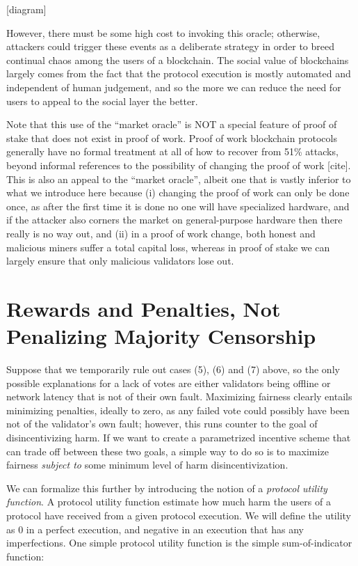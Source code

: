 \documentclass[12pt, final]{article}
\begin{document}
[diagram]

However, there must be some high cost to invoking this oracle; otherwise, attackers could trigger these events as a deliberate strategy in order to breed continual chaos among the users of a blockchain. The social value of blockchains largely comes from the fact that the protocol execution is mostly automated and independent of human judgement, and so the more we can reduce the need for users to appeal to the social layer the better.

Note that this use of the ``market oracle'' is NOT a special feature of proof of stake that does not exist in proof of work. Proof of work blockchain protocols generally have no formal treatment at all of how to recover from 51\% attacks, beyond informal references to the possibility of changing the proof of work [cite]. This is also an appeal to the ``market oracle'', albeit one that is vastly inferior to what we introduce here because (i) changing the proof of work can only be done once, as after the first time it is done no one will have specialized hardware, and if the attacker also corners the market on general-purpose hardware then there really is no way out, and (ii) in a proof of work change, both honest and malicious miners suffer a total capital loss, whereas in proof of stake we can largely ensure that only malicious validators lose out.

\section{Rewards and Penalties, Not Penalizing Majority Censorship}

Suppose that we temporarily rule out cases (5), (6) and (7) above, so the only possible explanations for a lack of votes are either validators being offline or network latency that is not of their own fault. Maximizing fairness clearly entails minimizing penalties, ideally to zero, as any failed vote could possibly have been not of the validator's own fault; however, this runs counter to the goal of disincentivizing harm. If we want to create a parametrized incentive scheme that can trade off between these two goals, a simple way to do so is to maximize fairness \textit{subject to} some minimum level of harm disincentivization.

We can formalize this further by introducing the notion of a \textit{protocol utility function}. A protocol utility function estimate how much harm the users of a protocol have received from a given protocol execution. We will define the utility as $0$ in a perfect execution, and negative in an execution that has any imperfections. One simple protocol utility function is the simple sum-of-indicator function:
\end{document}
